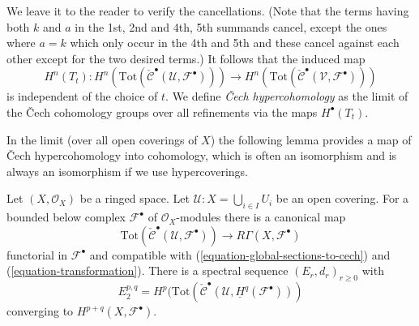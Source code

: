 We leave it to the reader to verify the cancellations. (Note that the
terms having both $k$ and $a$ in the 1st, 2nd and 4th, 5th summands
cancel, except the ones where $a = k$ which only occur in the 4th and 5th
and these cancel against each other except for the two desired terms.)
It follows that the induced map
$$
H^n(T_t) :
H^n(
\text{Tot}(\check{\mathcal{C}}^\bullet({\mathcal U}, {\mathcal F}^\bullet))
)
\to
H^n(
\text{Tot}(\check{\mathcal{C}}^\bullet({\mathcal V}, {\mathcal F}^\bullet))
)
$$
is independent of the choice of $t$. We define
{\it {\v C}ech hypercohomology} as the limit of the
{\v C}ech cohomology groups
over all refinements via the maps $H^\bullet(T_t)$.

\medskip\noindent
In the limit (over all open coverings of $X$) the following lemma provides
a map of {\v C}ech hypercohomology into cohomology, which is often an
isomorphism and is always an isomorphism if we use hypercoverings.

\begin{lemma}
\label{lemma-cech-complex-complex}
Let $(X, \mathcal{O}_X)$ be a ringed space.
Let $\mathcal{U} : X = \bigcup_{i \in I} U_i$ be
an open covering. For a bounded below complex $\mathcal{F}^\bullet$
of $\mathcal{O}_X$-modules there is a canonical map
$$
\text{Tot}(\check{\mathcal{C}}^\bullet(\mathcal{U}, \mathcal{F}^\bullet))
\longrightarrow
R\Gamma(X, \mathcal{F}^\bullet)
$$
functorial in $\mathcal{F}^\bullet$ and compatible with
(\ref{equation-global-sections-to-cech}) and (\ref{equation-transformation}).
There is a spectral sequence $(E_r, d_r)_{r \geq 0}$ with
$$
E_2^{p, q} =
H^p(\text{Tot}(\check{\mathcal{C}}^\bullet(\mathcal{U},
\underline{H}^q(\mathcal{F}^\bullet)))
$$
converging to $H^{p + q}(X, \mathcal{F}^\bullet)$.
\end{lemma}

